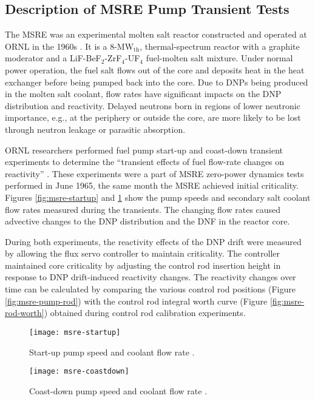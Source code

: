\subsection{Description of MSRE Pump Transient Tests}

The \gls{MSRE} was an experimental molten salt reactor constructed and operated at \gls{ORNL} in
the 1960s \cite{haubenreich_experience_1970}. It is a 8-MW$_{\text{th}}$, thermal-spectrum reactor
with a graphite moderator and a LiF-BeF$_2$-ZrF$_4$-UF$_4$ fuel-molten salt mixture. Under normal
power operation, the fuel salt flows out of the core and deposits heat in the heat exchanger before
being pumped back into the core. Due to
\glspl{DNP} being produced in the molten salt coolant, flow rates have significant impacts on the
\gls{DNP} distribution and reactivity. Delayed neutrons born in regions of lower neutronic
importance, e.g., at the periphery or outside the core, are more likely to be lost through neutron
leakage or parasitic absorption.

\gls{ORNL} researchers performed fuel pump start-up and coast-down transient experiments to
determine the ``transient effects of fuel flow-rate changes on reactivity''
\cite{prince_zero-power_1968}. These experiments were a part of \gls{MSRE} zero-power dynamics
tests performed in June 1965, the same month the \gls{MSRE} achieved initial criticality. Figures
\ref{fig:msre-startup} and \ref{fig:msre-coastdown} show the pump speeds and secondary salt coolant
flow rates measured during the transients. The changing flow rates caused advective changes to the
\gls{DNP} distribution and the \gls{DNF} in the reactor core.

During both experiments, the reactivity effects of the \gls{DNP} drift were measured by
allowing the flux servo controller to maintain criticality. The controller maintained core
criticality by adjusting the control rod insertion height in response to \gls{DNP} drift-induced
reactivity changes. The reactivity changes over time can be calculated by comparing the various
control rod positions (Figure \ref{fig:msre-pump-rod}) with the control rod integral worth curve
(Figure \ref{fig:msre-rod-worth}) obtained during control rod calibration experiments.

\begin{figure}[htb]
  \centering
  \begin{minipage}[t]{0.49\textwidth}
    \centering
    \texttt{[image: msre-startup]}
    \caption{Start-up pump speed and coolant flow rate \cite{prince_zero-power_1968}.}
    \label{fig:msre-startup}
  \end{minipage}
  \hfill
  \begin{minipage}[t]{0.49\textwidth}
    \centering
    \texttt{[image: msre-coastdown]}
    \caption{Coast-down pump speed and coolant flow rate \cite{prince_zero-power_1968}.}
    \label{fig:msre-coastdown}
  \end{minipage}
\end{figure}

